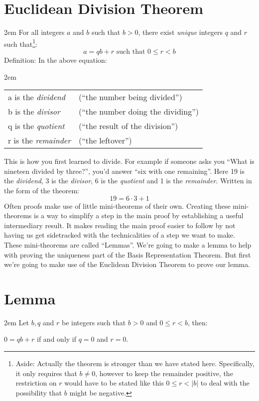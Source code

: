 \documentclass{article}
\newenvironment{jprIn}{\begin{adjustwidth}{2em}{}}{\end{adjustwidth}}
\begin{document}
\break
\section*{Euclidean Division Theorem}
\begin{jprIn}
For all integers $a$ and $b$ such that $b>0$,
there exist \emph{unique} integers $q$ and $r$ such that\footnote{Aside:
Actually the theorem is stronger than we have stated here.
Specifically, it only requires that $b\ne0$, however
to keep the remainder positive, the restriction on $r$
would have to be stated like
this $0\le{}r<\left|b\right|$ to deal with
the possibility that $b$ might be negative.}:
\[a=qb+r  \text{ such that } 0\le{}r<b\]
Definition: In the above equation:
\begin{jprIn}
\begin{tabular}{l l}
a is the \emph{dividend} & (``the number being divided'')\\
b is the \emph{divisor} & (``the number doing the dividing'')\\
q is the \emph{quotient} & (``the result of the division'')\\
r is the \emph{remainder} & (``the leftover'')
\end{tabular}
\end{jprIn}
\end{jprIn}
This is how you first learned to divide.
For example if someone asks you ``What is nineteen divided by three?'', you’d
answer ``six with one remaining''. Here 19 is the \emph{dividend},  3 is the \emph{divisor},
6 is the \emph{quotient} and 1 is the \emph{remainder}. Written in the form of the theorem:
\[19=6\cdot3+1\]
Often proofs make use of little mini-theorems of their own.
Creating these mini-theorems is a way to simplify a step in
the main proof by establishing a useful
intermediary result. It makes reading the main proof
easier to follow by not having us get sidetracked with
the technicalities of a step we want to make.
These mini-theorems are called ``Lemmas''.
We're going to make a lemma to help with proving the uniqueness part
of the Basis Representation Theorem. But first we're going to make use of the
Euclidean Division Theorem to prove our lemma.

\section*{Lemma}
\begin{jprIn}
Let $b, q$ and $r$ be integers such that $b>0$ and $0\le{}r<b$, then:
\begin{center}
$0=qb+r$ 
\hspace{1.5em}if and only if\hspace{1.5em}
$q=0$ and $r=0$.
\end{center}
\end{jprIn}
\end{document}
